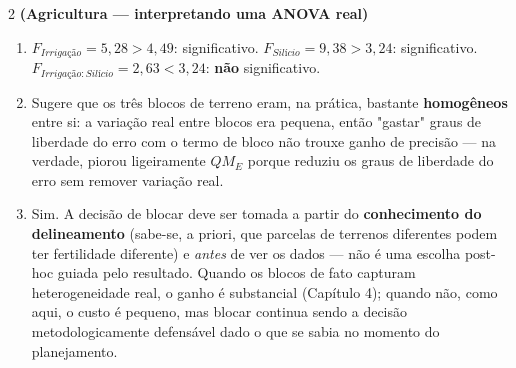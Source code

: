 \documentclass[11pt]{article}
\begin{document}
\begin{questao}{2} \textbf{(Agricultura --- interpretando uma ANOVA real)}
\end{questao}
\begin{solucao}
\begin{enumerate}[label=(\alph*)]
  \item $F_{Irrigação}=5{,}28 > 4{,}49$: significativo. $F_{Silício}=9{,}38>3{,}24$:
    significativo. $F_{Irrigação:Silício}=2{,}63<3{,}24$: \textbf{não} significativo.
  \item Sugere que os três blocos de terreno eram, na prática, bastante \textbf{homogêneos} entre
    si: a variação real entre blocos era pequena, então "gastar" graus de liberdade do erro com o
    termo de bloco não trouxe ganho de precisão --- na verdade, piorou ligeiramente $QM_E$ porque
    reduziu os graus de liberdade do erro sem remover variação real.
  \item Sim. A decisão de blocar deve ser tomada a partir do \textbf{conhecimento do
    delineamento} (sabe-se, a priori, que parcelas de terrenos diferentes podem ter fertilidade
    diferente) e \emph{antes} de ver os dados --- não é uma escolha post-hoc guiada pelo
    resultado. Quando os blocos de fato capturam heterogeneidade real, o ganho é substancial
    (Capítulo 4); quando não, como aqui, o custo é pequeno, mas blocar continua sendo a decisão
    metodologicamente defensável dado o que se sabia no momento do planejamento.
\end{enumerate}
\end{solucao}
\end{document}
